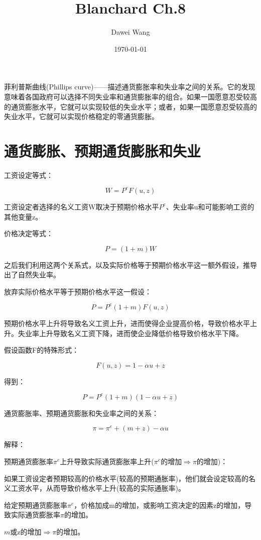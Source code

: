 \documentclass{article}
\title{Blanchard Ch.8}
\author{Dawei Wang}
\date{\today}
\begin{document}
	\maketitle
	菲利普斯曲线(Phillips curve)——描述通货膨胀率和失业率之间的关系。它的发现意味着各国政府可以选择不同失业率和通货膨胀率的组合。如果一国愿意忍受较高的通货膨胀水平，它就可以实现较低的失业水平；或者，如果一国愿意忍受较高的失业水平，它就可以实现价格稳定的零通货膨胀。

\section{通货膨胀、预期通货膨胀和失业}

工资设定等式：

\[
W=P^eF(u,z)
\]

工资设定者选择的名义工资W取决于预期价格水平$ P^e $、失业率u和可能影响工资的其他变量z。

价格决定等式：

\[
P=(1+m)W
\]

之后我们利用这两个关系式，以及实际价格等于预期价格水平这一额外假设，推导出了自然失业率。

放弃实际价格水平等于预期价格水平这一假设：

\[
P=P^e(1+m)F(u,z)
\]

预期价格水平上升将导致名义工资上升，进而使得企业提高价格，导致价格水平上升。失业率上升导致名义工资下降，进而使企业降低价格导致价格水平下降。

假设函数F的特殊形式：

\[
F(u,z)=1-\alpha u+z
\]

得到：

\[
P=P^e(1+m)(1-\alpha u+z)
\]	

通货膨胀率、预期通货膨胀和失业率之间的关系：

\[
\pi=\pi^e+(m+z)-\alpha u
\]

解释：

预期通货膨胀率$ \pi^e $上升导致实际通货膨胀率上升($ \pi^e $的增加$\Rightarrow$$ \pi $的增加)：

如果工资设定者预期较高的价格水平(较高的预期通胀率)，他们就会设定较高的名义工资水平，从而导致价格水平上升(较高的实际通胀率)。

\hspace*{\fill}

给定预期通货膨胀率$ \pi^e $，价格加成m的增加，或影响工资决定的因素z的增加，导致实际通货膨胀率$ \pi $的增加。

$ m $或z的增加$ \Rightarrow $$ \pi $的增加。
\end{document}
